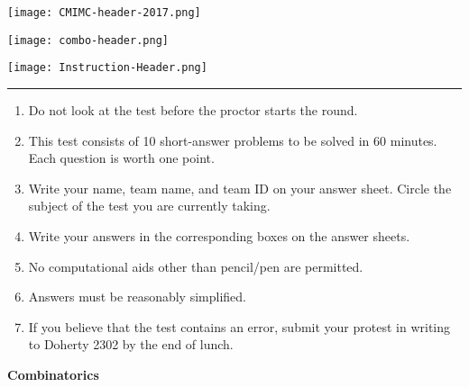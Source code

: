 \documentclass[10pt]{article}
\newcounter{enum}
\begin{document}
\thispagestyle{empty}
\begin{center}

\vspace*{90pt}

\texttt{[image: CMIMC-header-2017.png]}

\texttt{[image: combo-header.png]}

\vspace{1.6in}

\texttt{[image: Instruction-Header.png]}
\noindent\rule{17.7cm}{2pt}
\end{center}

\vspace{10pt}

\begin{enumerate}
\large
\item Do not look at the test before the proctor starts the round.

\item This test consists of 10 short-answer problems to be solved in 60 minutes.
	Each question is worth one point.

\item Write your name, team name, and team ID on your answer sheet. Circle the
	subject of the test you are currently taking.

\item Write your answers in the corresponding boxes on the answer sheets.

\item No computational aids other than pencil/pen are permitted.

\item Answers must be reasonably simplified.

\item If you believe that the test contains an error, submit your protest in writing to Doherty 2302 by the end of lunch.
\end{enumerate}
\newpage

\begin{center}
\huge\textbf{Combinatorics}\normalsize

\vspace{3pt}
\end{center}
\end{document}
